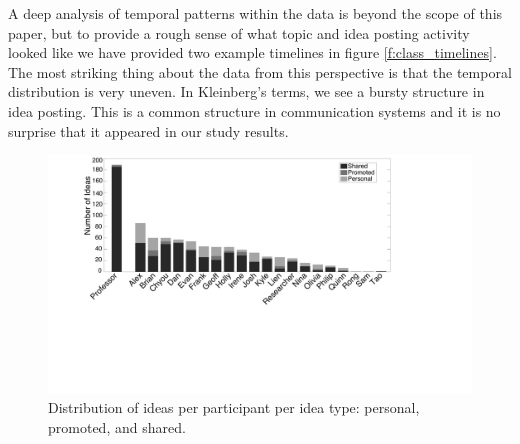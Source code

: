 A deep analysis of temporal patterns within the data is beyond the scope of this paper, but to provide a rough sense of what topic and idea posting activity looked like we have provided two example timelines in figure \ref{f:class_timelines}. The most striking thing about the data from this perspective is that the temporal distribution is very uneven. In Kleinberg's terms, we see a bursty structure \citep{Kleinberg:2003ej} in idea posting. This is a common structure in communication systems and it is no surprise that it appeared in our study results. 



\begin{figure}[t]
\centering
\includegraphics{figures/tincan/ideas_per_participant.pdf}
\caption{Distribution of ideas per participant per idea type: personal, promoted, and shared.}
\label{f:ideas_per_participant}
\end{figure}





